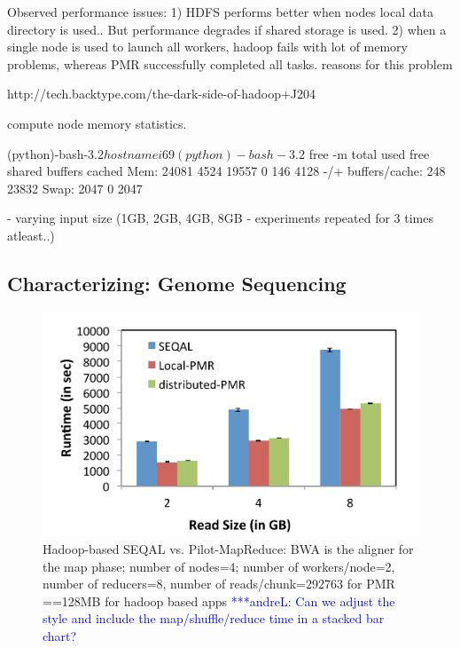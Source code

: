 \documentclass{acm_proc_article-sp}
\newcommand{\alnote}[1]{ {\textcolor{blue} { ***andreL: #1 }}}
\newcommand{\alnote}[1]{}
\begin{document}
Observed performance issues:
1) HDFS performs better when nodes local data directory is used.. But performance degrades if shared storage is used. 			
2) when a single node is used to launch all workers, hadoop fails with lot of memory problems, whereas PMR successfully completed all tasks.			
reasons for this problem

http://tech.backtype.com/the-dark-side-of-hadoop+J204		

compute node memory statistics.

(python)-bash-3.2$ hostname
i69
(python)-bash-3.2$ free -m
                  total          used       free     shared    buffers     cached
Mem:         24081       4524      19557          0        146       4128
-/+ buffers/cache:       248      23832
Swap:         2047          0       2047
	

         - varying input size (1GB, 2GB, 4GB, 8GB - experiments repeated for 3 times atleast..)




\subsection{Characterizing: Genome Sequencing}


\begin{figure}
 \centering
\includegraphics[scale=0.50]{figures/seqalvslocalpmr.pdf}
\caption{\small Hadoop-based SEQAL vs. Pilot-MapReduce:  BWA is the aligner for the map phase; number of nodes=4; number of workers/node=2, number of reducers=8, number of reads/chunk=292763 for PMR ==128MB for hadoop based apps
\alnote{Can we adjust the style and include the map/shuffle/reduce time in a stacked bar chart?}}
 \label{fig:comp_with_seqal_1} 
\end{figure}
\end{document}
